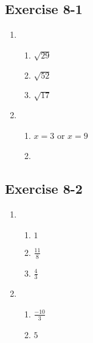 \subsection{Exercise 8-1} %
\begin{enumerate}[label=\textbf{\arabic*}.]
\item %
 \begin{enumerate}[noitemsep, label=\textbf{(\alph*)} ] 
\item $\sqrt{29}$%
\item $\sqrt{52}$%
\item $\sqrt{17}$%
\end{enumerate}

\item %
 \begin{enumerate}[noitemsep, label=\textbf{(\alph*)} ] 
\item $x = 3$ or $x = 9$%
\item %
\end{enumerate}
\end{enumerate}

\subsection{Exercise 8-2} %
\begin{enumerate}[noitemsep, label=\textbf{\arabic*}. ]
\item %
 \begin{enumerate}[noitemsep, label=\textbf{(\alph*)} ] 
\item $1$%
\item $\frac{11}{8}$%
\item $\frac{4}{3}$%
\end{enumerate}

\item %
\begin{enumerate}[noitemsep, label=\textbf{(\alph*)} ] 
\item $\frac{-10}{3}$%
\item $5$%
\end{enumerate}
\end{enumerate}


